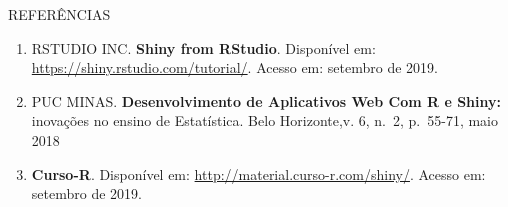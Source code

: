 \documentclass[
  ignorenonframetext,
]{beamer}
\providecommand{\tightlist}{%
  \setlength{\itemsep}{0pt}\setlength{\parskip}{0pt}}
\begin{document}
\begin{frame}{REFERÊNCIAS}
\protect\hypertarget{referencias}{}

\begin{enumerate}
\tightlist
\item
  RSTUDIO INC. \textbf{Shiny from RStudio}. Disponível em:
  \url{https://shiny.rstudio.com/tutorial/}. Acesso em: setembro de
  2019.
\item
  PUC MINAS. \textbf{Desenvolvimento de Aplicativos Web Com R e Shiny:}
  inovações no ensino de Estatística. Belo Horizonte,v. 6, n.~2,
  p.~55-71, maio 2018
\item
  \textbf{Curso-R}. Disponível em:
  \url{http://material.curso-r.com/shiny/}. Acesso em: setembro de 2019.
\end{enumerate}

\end{frame}
\end{document}
